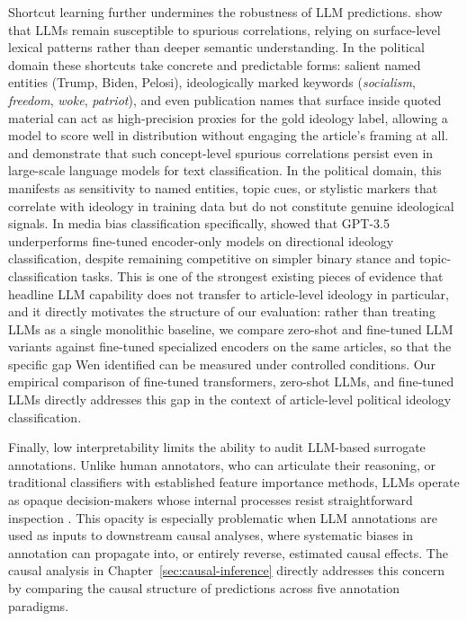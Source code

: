 Shortcut learning further undermines the robustness of LLM predictions. \citet{yuan2024llmsovercomeshortcutlearning} show that LLMs remain susceptible to spurious correlations, relying on surface-level lexical patterns rather than deeper semantic understanding. In the political domain these shortcuts take concrete and predictable forms: salient named entities (Trump, Biden, Pelosi), ideologically marked keywords (\emph{socialism}, \emph{freedom}, \emph{woke}, \emph{patriot}), and even publication names that surface inside quoted material can act as high-precision proxies for the gold ideology label, allowing a model to score well in distribution without engaging the article's framing at all. and \citet{zhou2024explorespuriouscorrelationsconcept} demonstrate that such concept-level spurious correlations persist even in large-scale language models for text classification. In the political domain, this manifests as sensitivity to named entities, topic cues, or stylistic markers that correlate with ideology in training data but do not constitute genuine ideological signals. In media bias classification specifically, \citet{Wen_2023} showed that GPT-3.5 underperforms fine-tuned encoder-only models on directional ideology classification, despite remaining competitive on simpler binary stance and topic-classification tasks. This is one of the strongest existing pieces of evidence that headline LLM capability does not transfer to article-level ideology in particular, and it directly motivates the structure of our evaluation: rather than treating LLMs as a single monolithic baseline, we compare zero-shot and fine-tuned LLM variants against fine-tuned specialized encoders on the same articles, so that the specific gap Wen identified can be measured under controlled conditions. Our empirical comparison of fine-tuned transformers, zero-shot LLMs, and fine-tuned LLMs directly addresses this gap in the context of article-level political ideology classification.

Finally, low interpretability limits the ability to audit LLM-based surrogate annotations. Unlike human annotators, who can articulate their reasoning, or traditional classifiers with established feature importance methods, LLMs operate as opaque decision-makers whose internal processes resist straightforward inspection \citep{moraffah2020causal}. This opacity is especially problematic when LLM annotations are used as inputs to downstream causal analyses, where systematic biases in annotation can propagate into, or entirely reverse, estimated causal effects. The causal analysis in Chapter~\ref{sec:causal-inference} directly addresses this concern by comparing the causal structure of predictions across five annotation paradigms.
